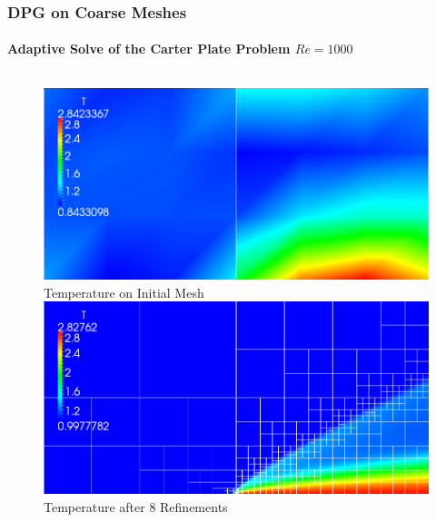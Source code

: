 \documentclass[18pt,xcolor=table]{beamer}
\begin{document}
\begin{frame}[t]
\frametitle{DPG on Coarse Meshes}
\framesubtitle{Adaptive Solve of the Carter Plate Problem $Re=1000$}
\begin{columns}
\begin{column}{0.49\textwidth}
\begin{figure}
\centering
\includegraphics[width=1.0\textwidth]{Motivation/PlateMovie/T0.png}\\
\vspace{-1ex}
{\scriptsize Temperature on Initial Mesh}\\
\vspace{1ex}
\includegraphics[width=1.0\textwidth]{Motivation/PlateMovie/T8.png}
\vspace{-1ex}
{\scriptsize Temperature after 8 Refinements}
\vspace{1ex}


\end{figure}
\end{column}
\end{columns}
\end{frame}
\end{document}
